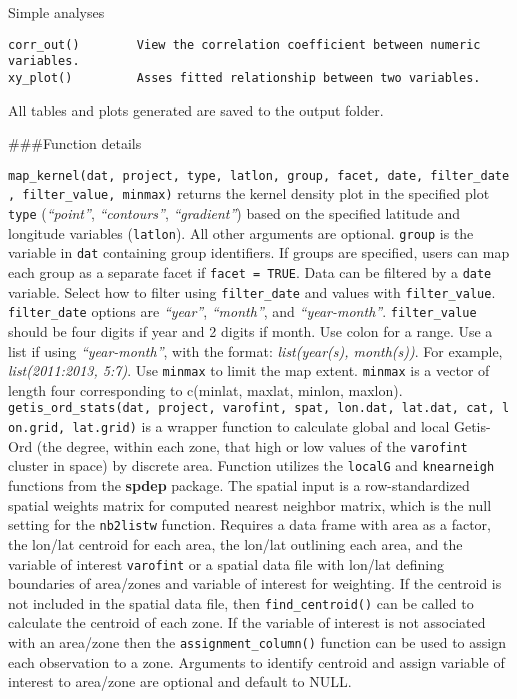 \documentclass[
]{article}
\begin{document}
Simple analyses

\begin{verbatim}
corr_out()        View the correlation coefficient between numeric variables.   
xy_plot()         Asses fitted relationship between two variables.  
\end{verbatim}

All tables and plots generated are saved to the output folder.

\#\#\#Function details

\texttt{map\_kernel(dat,\ project,\ type,\ latlon,\ group,\ facet,\ date,\ filter\_date,\ filter\_value,\ minmax)} returns the kernel density plot in the specified plot \texttt{type} (\emph{``point''}, \emph{``contours''}, \emph{``gradient''}) based on the specified latitude and longitude variables (\texttt{latlon}). All other arguments are optional. \texttt{group} is the variable in \texttt{dat} containing group identifiers. If groups are specified, users can map each group as a separate facet if \texttt{facet\ =\ TRUE}. Data can be filtered by a \texttt{date} variable. Select how to filter using \texttt{filter\_date} and values with \texttt{filter\_value}. \texttt{filter\_date} options are \emph{``year''}, \emph{``month''}, and \emph{``year-month''}. \texttt{filter\_value} should be four digits if year and 2 digits if month. Use colon for a range. Use a list if using \emph{``year-month''}, with the format: \emph{list(year(s), month(s))}. For example, \emph{list(2011:2013, 5:7)}. Use \texttt{minmax} to limit the map extent. \texttt{minmax} is a vector of length four corresponding to c(minlat, maxlat, minlon, maxlon).\\
\texttt{getis\_ord\_stats(dat,\ project,\ varofint,\ spat,\ lon.dat,\ lat.dat,\ cat,\ lon.grid,\ lat.grid)} is a wrapper function to calculate global and local Getis-Ord (the degree, within each zone, that high or low values of the \texttt{varofint} cluster in space) by discrete area. Function utilizes the \texttt{localG} and \texttt{knearneigh} functions from the \textbf{spdep} package. The spatial input is a row-standardized spatial weights matrix for computed nearest neighbor matrix, which is the null setting for the \texttt{nb2listw} function. Requires a data frame with area as a factor, the lon/lat centroid for each area, the lon/lat outlining each area, and the variable of interest \texttt{varofint} or a spatial data file with lon/lat defining boundaries of area/zones and variable of interest for weighting. If the centroid is not included in the spatial data file, then \texttt{find\_centroid()} can be called to calculate the centroid of each zone. If the variable of interest is not associated with an area/zone then the \texttt{assignment\_column()} function can be used to assign each observation to a zone. Arguments to identify centroid and assign variable of interest to area/zone are optional and default to NULL.\\
\end{document}
